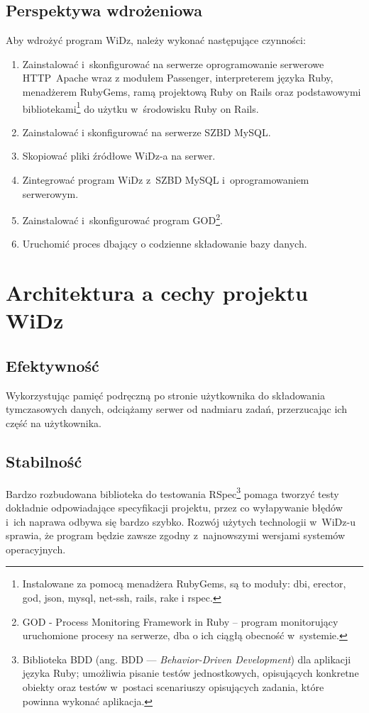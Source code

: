 \documentclass[12pt,leqno,twoside]{mwart}
\begin{document}
\subsection{Perspektywa wdrożeniowa}
\noindent Aby wdrożyć program WiDz, należy wykonać następujące czynności:
\begin{enumerate}
	\item Zainstalować i~skonfigurować na serwerze oprogramowanie serwerowe \hbox{HTTP Apache} wraz z modułem Passenger, interpreterem języka Ruby, menadżerem RubyGems, ramą projektową Ruby on Rails oraz podstawowymi bibliotekami\footnote{Instalowane za pomocą menadżera RubyGems, są to moduły: dbi, erector, god, json, mysql, net-ssh, rails, rake i rspec.} do użytku w~środowisku Ruby on Rails.
	\item Zainstalować i skonfigurować na serwerze SZBD MySQL.
	\item Skopiować pliki źródłowe WiDz-a na serwer.
	\item Zintegrować program WiDz z~SZBD MySQL i~oprogramowaniem serwerowym.
	\item Zainstalować i~skonfigurować program GOD\footnote{GOD - Process Monitoring Framework in Ruby -- program monitorujący uruchomione procesy na serwerze, dba o ich ciągłą obecność w~systemie.}.
	\item Uruchomić proces dbający o codzienne składowanie bazy danych.
\end{enumerate}

\section{Architektura a cechy projektu WiDz}
\subsection{Efektywność}
\noindent Wykorzystując pamięć podręczną po stronie użytkownika do składowania tymczasowych danych, odciążamy serwer od nadmiaru zadań, przerzucając ich część na użytkownika.
 
\subsection{Stabilność}
\noindent Bardzo rozbudowana biblioteka do testowania RSpec\footnote{Biblioteka BDD (ang. BDD --- \textit{Behavior-Driven Development}) dla aplikacji języka Ruby; umożliwia pisanie testów jednostkowych, opisujących konkretne obiekty oraz testów w~postaci scenariuszy opisujących zadania, które powinna wykonać aplikacja.} pomaga tworzyć testy dokładnie odpowiadające specyfikacji projektu, przez co wyłapywanie błędów i~ich naprawa odbywa się bardzo szybko. Rozwój użytych technologii w~WiDz-u sprawia, że program będzie zawsze zgodny z~najnowszymi wersjami systemów operacyjnych.
\end{document}
